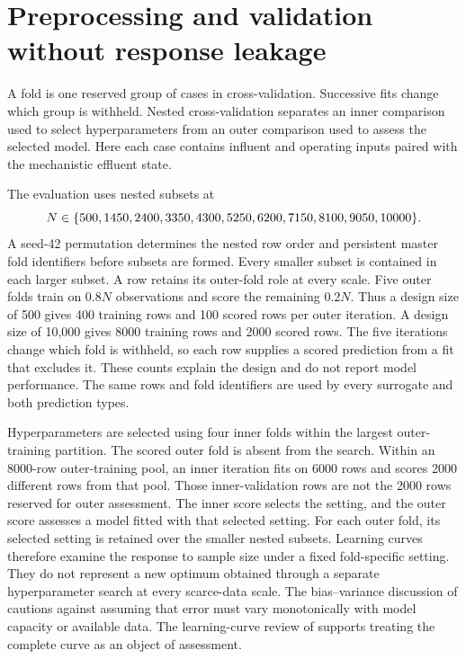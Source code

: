 \section{Preprocessing and validation without response leakage}

A fold is one reserved group of cases in cross-validation. Successive fits change which group is withheld. Nested cross-validation separates an inner comparison used to select hyperparameters from an outer comparison used to assess the selected model. Here each case contains influent and operating inputs paired with the mechanistic effluent state.

The evaluation uses nested subsets at
\begin{equation}
\equationname{Observation counts for nested reactor assessment}
N\in\{500,1450,2400,3350,4300,5250,6200,7150,8100,9050,10000\}.
\label{eq:reactor_nested_sample_sizes}
\end{equation}
A seed-42 permutation determines the nested row order and persistent master fold identifiers before subsets are formed. Every smaller subset is contained in each larger subset. A row retains its outer-fold role at every scale. Five outer folds train on $0.8N$ observations and score the remaining $0.2N$. Thus a design size of 500 gives 400 training rows and 100 scored rows per outer iteration. A design size of 10,000 gives 8000 training rows and 2000 scored rows. The five iterations change which fold is withheld, so each row supplies a scored prediction from a fit that excludes it. These counts explain the design and do not report model performance. The same rows and fold identifiers are used by every surrogate and both prediction types.

Hyperparameters are selected using four inner folds within the largest outer-training partition. The scored outer fold is absent from the search. Within an 8000-row outer-training pool, an inner iteration fits on 6000 rows and scores 2000 different rows from that pool. Those inner-validation rows are not the 2000 rows reserved for outer assessment. The inner score selects the setting, and the outer score assesses a model fitted with that selected setting. For each outer fold, its selected setting is retained over the smaller nested subsets. Learning curves therefore examine the response to sample size under a fixed fold-specific setting. They do not represent a new optimum obtained through a separate hyperparameter search at every scarce-data scale. The bias--variance discussion of \citet{Belkin2019} cautions against assuming that error must vary monotonically with model capacity or available data. The learning-curve review of \citet{VieringLoog2023} supports treating the complete curve as an object of assessment.

